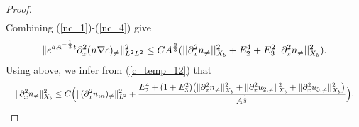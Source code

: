 \documentclass[12pt, reqno]{amsart}
\numberwithin{equation}{section}
\begin{document}
\begin{proof}
\begin{equation}
\begin{aligned}
			\end{aligned}
		\end{equation}
		Combining (\ref{nc_1})-(\ref{nc_4}) give
		\begin{equation}\label{nc_end}
			\begin{aligned}
				\|{\rm e}^{aA^{-\frac{1}{3}}t}\partial_x^2(n\nabla c)_{\neq}\|^2_{L^2L^2}
				\leq CA^{\frac{2}{3}}(||\partial_x^2n_{\neq}||^2_{X_b}
				+E_2^4
				+E_3^2||\partial_x^2n_{\neq}||^2_{X_b}).
			\end{aligned}
		\end{equation}
		Using above, we infer from (\ref{c_temp_12}) that 
		\begin{equation}\label{n_xx_result}
			\begin{aligned}
				&\quad\|\partial_x^2n_{\neq}\|^2_{X_b}\leq C\Big( \|(\partial_x^2n_{\rm in})_{\neq}\|^2_{L^2}
				+\frac{E_2^4+(1+E_3^2)\big(\|\partial_x^2n_{\neq}\|^2_{X_b}
					+\|\partial_x^2u_{2,\neq}\|^2_{X_b}
					+\|\partial_x^2u_{3,\neq}\|^2_{X_b}\big)}{A^{\frac{1}{3}}}\Big).
			\end{aligned}
		\end{equation}
		

\end{proof}
\end{document}
